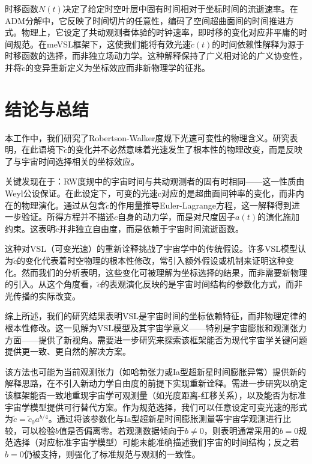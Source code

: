 \documentclass[jkps,preprint,fleqn]{revtex4}
\newcommand{\tc}{\tilde{c}}
\begin{document}
\begin{CJK*}{UTF8}{gbsn}
时移函数$N(t)$决定了给定时空叶层中固有时间相对于坐标时间的流逝速率。在ADM分解中，它反映了时间切片的任意性，编码了空间超曲面间的时间推进方式。物理上，它设定了共动观测者体验的时钟速率，即时移的变化对应非平庸的时间规范。在meVSL框架下，这使我们能将有效光速$\tc(t)$的时间依赖性解释为源于时移函数的选择，而非独立场动力学。这种解释保持了广义相对论的广义协变性，并将$\tc$的变异重新定义为坐标效应而非新物理学的征兆。
\section{结论与总结}\label{sec:Conc}
本工作中，我们研究了Robertson-Walker度规下光速可变性的物理含义。研究表明，在此语境下$\tc$的变化并不必然意味着光速发生了根本性的物理改变，而是反映了与宇宙时间选择相关的坐标效应。

关键发现在于：RW度规中的宇宙时间与共动观测者的固有时相同——这一性质由Weyl公设保证。在此设定下，可变的光速c对应的是超曲面间钟率的变化，而非内在的物理演化。通过从包含$\tc$的作用量推导Euler-Lagrange方程，这一解释得到进一步验证。所得方程并不描述$c$自身的动力学，而是对尺度因子$a(t)$的演化施加约束。这表明$\tc$并非独立自由度，而是依赖于宇宙时间流逝函数。

这种对VSL（可变光速）的重新诠释挑战了宇宙学中的传统假设。许多VSL模型认为$\tc$的变化代表着时空物理的根本性修改，常引入额外假设或机制来证明这种变化。然而我们的分析表明，这些变化可被理解为坐标选择的结果，而非需要新物理的引入。从这个角度看，$\tc$的表观演化反映的是宇宙时间结构的参数化方式，而非光传播的实际改变。

综上所述，我们的研究结果表明VSL是宇宙时间的坐标依赖特征，而非物理定律的根本性修改。这一见解为VSL模型及其宇宙学意义——特别是宇宙膨胀和观测张力方面——提供了新视角。需要进一步研究来探索该框架能否为现代宇宙学关键问题提供更一致、更自然的解决方案。

该方法也可能为当前观测张力（如哈勃张力或Ia型超新星时间膨胀异常）提供新的解释思路，在不引入新动力学自由度的前提下实现重新诠释。需进一步研究以确定该框架能否一致地重现宇宙学可观测量（如光度距离-红移关系），以及能否为标准宇宙学模型提供可行替代方案。作为规范选择，我们可以任意设定可变光速的形式为$\tc = \tc_0 a^{b/4}$。通过将该参数化与Ia型超新星时间膨胀测量等宇宙学观测进行比较，可以检验$b$值是否偏离零。若观测数据倾向于$b \neq 0$，则表明通常采用的$b = 0$规范选择（对应标准宇宙学模型）可能未能准确描述我们宇宙的时间结构；反之若$b = 0$仍被支持，则强化了标准规范与观测的一致性。


\end{CJK*}
\end{document}
